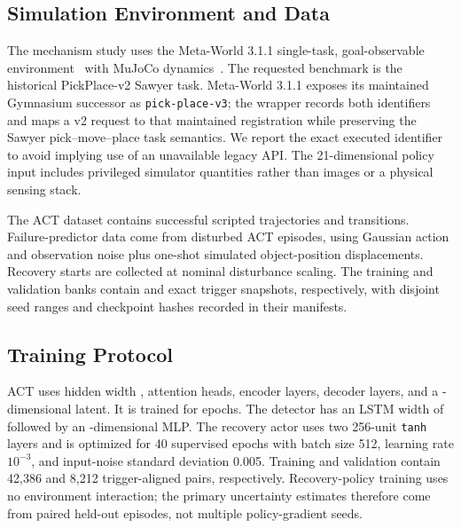 \documentclass[conference]{IEEEtran}
\begin{document}
\subsection{Simulation Environment and Data}

The mechanism study uses the Meta-World 3.1.1 \REIMTask{} single-task,
goal-observable environment~\cite{yu2020metaworld} with MuJoCo
dynamics~\cite{todorov2012mujoco}. The requested benchmark is the historical
PickPlace-v2 Sawyer task. Meta-World 3.1.1 exposes its maintained Gymnasium
successor as \texttt{pick-place-v3}; the wrapper records both identifiers and
maps a v2 request to that maintained registration while preserving the Sawyer
pick--move--place task semantics. We report the exact executed identifier to
avoid implying use of an unavailable legacy API. The 21-dimensional policy
input includes privileged simulator quantities rather than images or a
physical sensing stack.

The ACT dataset contains \REIMDemoTrajectories{} successful scripted
trajectories and \REIMDemoTransitions{} transitions. Failure-predictor data
come from \DetectorTrainingEpisodes{} disturbed ACT episodes, using Gaussian
action and observation noise plus one-shot simulated object-position
displacements. Recovery
starts are collected at \CurriculumNoiseLevel{} nominal disturbance scaling.
The training and validation banks contain \RecoveryTrainStarts{} and
\RecoveryValidationStarts{} exact trigger snapshots, respectively, with
disjoint seed ranges and checkpoint hashes recorded in their manifests.

\subsection{Training Protocol}

ACT uses hidden width \ACTHiddenDim{}, \ACTAttentionHeads{} attention heads,
\ACTEncoderLayers{} encoder layers, \ACTDecoderLayers{} decoder layers, and a
\ACTLatentDim-dimensional latent. It is trained for \ACTTrainingEpochs{}
epochs. The detector has an LSTM width of \DetectorHiddenDim{} followed by an
\DetectorMLPDim-dimensional MLP. The recovery actor uses two 256-unit
\texttt{tanh} layers and is optimized for 40 supervised epochs with batch size
512, learning rate $10^{-3}$, and input-noise standard deviation 0.005.
Training and validation contain 42,386 and 8,212 trigger-aligned pairs,
respectively. Recovery-policy training uses no environment interaction; the
primary uncertainty estimates therefore come from paired held-out episodes,
not multiple policy-gradient seeds.
\end{document}
